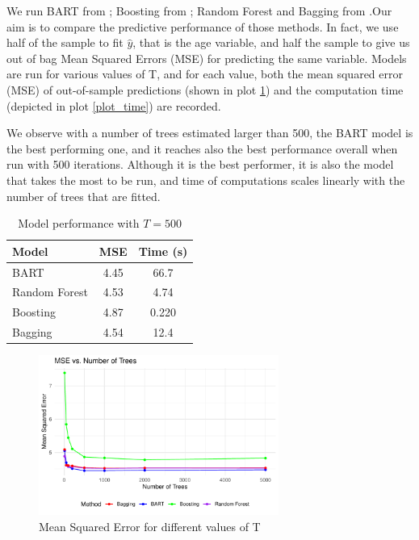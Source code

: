 \documentclass[a4paper,11pt]{article}
\begin{document}
We run BART from \cite{mccullochBARTBayesianAdditive2024}; Boosting from \cite{ridgewayGbmGeneralizedBoosted2024}; Random Forest and Bagging from \cite{breimanRandomForestBreimanCutlers2024}.Our aim is to compare the predictive performance of those methods. In fact,  we use half of the sample to fit $\hat{y}$, that is the age variable, and half the sample to give us out of bag Mean Squared Errors (MSE) for predicting the same variable. Models are run for various values of T, and for each value, both the mean squared error (MSE) of out-of-sample predictions (shown in plot \ref{plot_mse}) and the computation time (depicted in plot \ref{plot_time}) are recorded.

We observe with a number of trees estimated larger than 500, the BART model is the best performing one, and it reaches also the best performance overall when run with 500 iterations. Although it is the best performer, it is also the model that takes the most to be run, and time of computations scales linearly with the number of trees that are fitted.

\begin{table}[ht]
  \centering
  \begin{tabular}{lcc}
  \toprule
  Model           & MSE & Time (s) \\
  \midrule
  BART            & 4.45    & 66.7  \\
  Random Forest   & 4.53    & 4.74  \\
  Boosting        & 4.87    & 0.220 \\
  Bagging         & 4.54    & 12.4  \\
  \bottomrule
  \end{tabular}
  \caption{Model performance with $T=500$}
  \end{table}


\begin{figure}
  \centering
  \includegraphics[width=0.7\textwidth]{../outputs/mse_plot.pdf}
  \caption{Mean Squared Error for different values of T}
  \label{plot_mse}
\end{figure}
\end{document}

